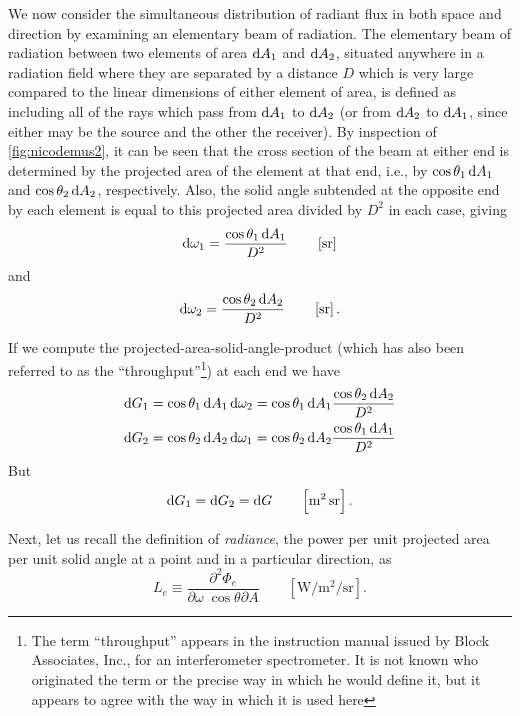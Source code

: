 \begin{refsection}
We now consider the simultaneous distribution of radiant flux in both space
and direction by examining an elementary beam of radiation. The elementary beam
of radiation between two elements of area $\mathop{}\!\mathrm{d} A_1$ and $\mathop{}\!\mathrm{d} A_2$, situated anywhere in
a radiation field where they are separated by a distance $D$ which is very large
compared to the linear dimensions of either element of area, is defined as
including
all of the rays which pass from $\mathop{}\!\mathrm{d} A_1$ to $\mathop{}\!\mathrm{d} A_2$ (or from $\mathop{}\!\mathrm{d} A_2$ to $\mathop{}\!\mathrm{d} A_1$, since either
may be the source and the other the receiver).
By inspection of \cref{fig:nicodemus2}, it can be seen that the cross
section of
the beam at either end is determined by the projected area of the element at
that end,
i.e., by $\cos\theta_1 \mathop{}\!\mathrm{d} A_1$ and $\cos\theta_2 \mathop{}\!\mathrm{d} A_2$, respectively. Also, the
solid angle
subtended at the opposite end by each element is equal to this projected area
divided by
$D^2$ in each case, giving
\begin{equation*}
\d \omega_1 = \frac{\cos\theta_1 \d A_1}{D^2}
\qquad \left[\unit{\steradian}\right]
\end{equation*}
and
\begin{equation}
\d \omega_2 = \frac{\cos\theta_2 \d A_2}{D^2}
\qquad \left[\unit{\steradian}\right].
\end{equation}

If we compute the projected-area-solid-angle-product (which has also been
referred
to as the ``throughput''\footnote{\label{note:nicodemus7} The term
``throughput'' appears
in the instruction manual issued by Block Associates, Inc., for an
interferometer
spectrometer. It is not known who originated the term or the precise way in
which
he would define it, but it appears to agree with the way in which it is used
here})
at each end we have
\begin{align*}
\d G_1 &= \cos\theta_1 \d A_1 \d \omega_2 = \cos\theta_1 \d A_1 \frac{\cos\theta_2
\d A_2}{D^2} \\
\d G_2 &= \cos\theta_2 \d A_2 \d \omega_1 = \cos\theta_2 \d A_2 \frac{\cos\theta_1
\d A_1}{D^2}
\end{align*}
But
\begin{equation}
\d G_1 = \d G_2 = \d G
\qquad \left[\unit{\square\meter\steradian}\right].
\end{equation}

Next, let us recall the definition of \textsl{radiance}, the power per unit
projected
area per unit solid angle at a point and in a particular direction, as
\begin{equation*}
L_e \equiv \frac{\partial^2 \Phi_e}{\partial\omega\;\cos\theta \partial A}
\qquad \left[\unit{\watt\per\square\meter\per\steradian}\right].
\end{equation*}


\end{refsection}
